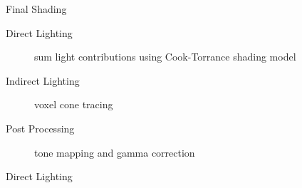 \documentclass[10pt]{beamer}
\begin{document}


\begin{frame}{Final Shading}
  \begin{description}
    \item[Direct Lighting] sum light contributions using Cook-Torrance shading model
    \item[Indirect Lighting] voxel cone tracing
    \item[Post Processing] tone mapping and gamma correction
  \end{description}
\end{frame}

\begin{frame}{Direct Lighting}
  \begin{algorithm}[H]
    \begin{algorithmic}
        \EndIf
      \EndFor
    \end{algorithmic}
  \end{algorithm}
\end{frame}
\end{document}
